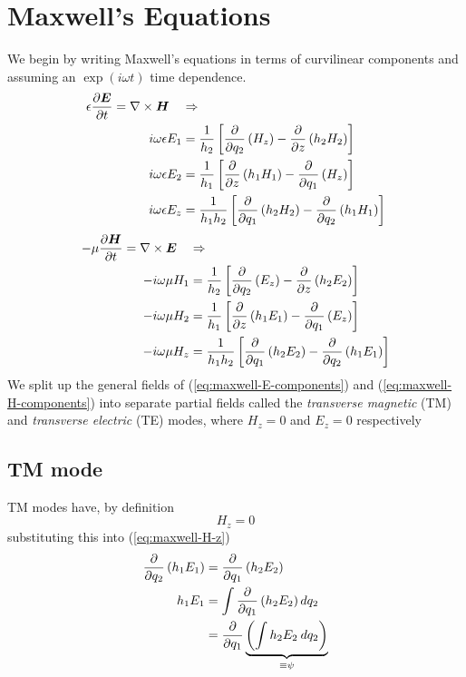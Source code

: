 \documentclass[twoside, a4paper]{article}
\begin{document}
\section{Maxwell's Equations}
We begin by writing Maxwell's equations in terms of curvilinear components and assuming an $\exp(i \omega t)$ time dependence.
\begin{subequations}
\label{eq:maxwell-E-components}
\begin{align}
\epsilon \frac{\partial \mbox{\boldmath$ E $}}{\partial t} = \nabla \times \mbox{\boldmath$ H $} \quad & \Rightarrow \nonumber \\
\label{eq:maxwell-E-1}
i \omega \epsilon E_1 & = \frac{1}{h_2}
	\left[ \displaystyle
	\frac{\partial }{\partial q_2} \left( H_z \right) -
	\frac{\partial }{\partial z} \left( h_2 H_2 \right)
	\right] \\
\label{eq:maxwell-E-2}
i \omega \epsilon E_2 & = \frac{1}{h_1}
	\left[ \displaystyle
	\frac{\partial }{\partial z} \left( h_1 H_1 \right) -
	\frac{\partial }{\partial q_1} \left( H_z \right)
	\right] \\
\label{eq:maxwell-E-z}
i \omega \epsilon E_z & = \frac{1}{h_1 h_2}
	\left[ \displaystyle
	\frac{\partial }{\partial q_1} \left( h_2 H_2 \right) -
	\frac{\partial }{\partial q_2} \left( h_1 H_1 \right)
	\right] 
\end{align}
\end{subequations}
\begin{subequations}
\label{eq:maxwell-H-components}
\begin{align}
- \mu \frac{\partial \mbox{\boldmath$ H $}}{\partial t} = \nabla \times \mbox{\boldmath$ E $} \quad & \Rightarrow \nonumber \\
\label{eq:maxwell-H-1}
-i \omega \mu H_1 & = \frac{1}{h_2}
	\left[ \displaystyle
	\frac{\partial }{\partial q_2} \left( E_z \right) -
	\frac{\partial }{\partial z} \left( h_2 E_2 \right)
	\right] \\
\label{eq:maxwell-H-2}
-i \omega \mu H_2 & = \frac{1}{h_1}
	\left[ \displaystyle
	\frac{\partial }{\partial z} \left( h_1 E_1 \right) -
	\frac{\partial }{\partial q_1} \left( E_z \right)
	\right] \\
\label{eq:maxwell-H-z}
-i \omega \mu H_z & = \frac{1}{h_1 h_2}
	\left[ \displaystyle
	\frac{\partial }{\partial q_1} \left( h_2 E_2 \right) -
	\frac{\partial }{\partial q_2} \left( h_1 E_1 \right)
	\right]
\end{align}
\end{subequations}
We split up the general fields of (\ref{eq:maxwell-E-components}) and (\ref{eq:maxwell-H-components}) into separate partial fields called the \textit{transverse magnetic} (TM) and \textit{transverse electric} (TE) modes, where \mbox{$H_z=0$} and \mbox{$E_z=0$} respectively


\subsection{TM mode}
TM modes have, by definition 
\begin{equation}
\label{eq:TM-Hz}
\boxed{
\quad
H_z=0
\quad
}
\end{equation}
substituting this into (\ref{eq:maxwell-H-z})
\begin{align*}
\frac{\partial }{\partial q_2} \left( h_1 E_1 \right) & = \frac{\partial }{\partial q_1} \left( h_2 E_2 \right)  \\
h_1 E_1 & = \int \frac{\partial }{\partial q_1} \left( h_2 E_2 \right) dq_2 \\ 
& = \frac{\partial }{\partial q_1} \underbrace{\left( \int h_2 E_2 \: dq_2 \right)}_{\equiv \psi}
\end{align*}
\end{document}
